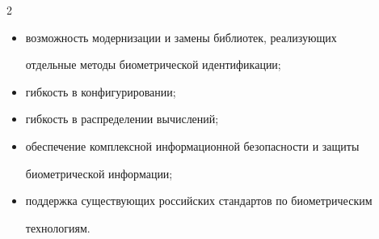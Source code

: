 \begin{multicols}{2}
\begin{itemize}
нескольким биометрическим признакам;

\item возможность модернизации и замены библиотек, реализующих 

отдельные методы биометрической идентификации;

\item гибкость в конфигурировании;

\item гибкость в распределении вычислений;

\item обеспечение комплексной информационной безопасности и защиты 

биометрической информации;

\item поддержка существующих российских стандартов по биометрическим 

технологиям.

\end{itemize}



 \end{multicols}



